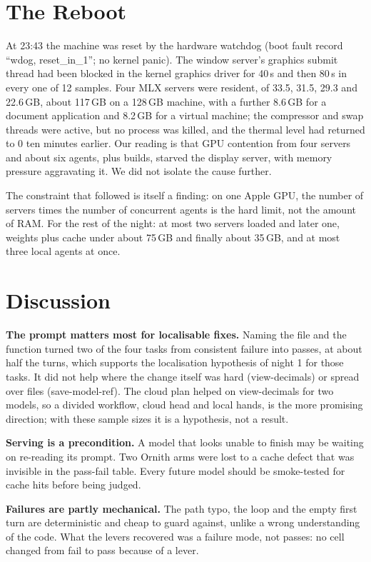 \section{The Reboot}\label{sec:reboot}

At 23:43 the machine was reset by the hardware watchdog (boot fault record ``wdog, reset\_in\_1''; no kernel panic).
The window server's graphics submit thread had been blocked in the kernel graphics driver for 40\,s and then 80\,s in
every one of 12 samples. Four MLX servers were resident, of 33.5, 31.5, 29.3 and 22.6\,GB, about 117\,GB on a 128\,GB
machine, with a further 8.6\,GB for a document application and 8.2\,GB for a virtual machine; the compressor and swap
threads were active, but no process was killed, and the thermal level had returned to 0 ten minutes earlier. Our
reading is that GPU contention from four servers and about six agents, plus builds, starved the display server, with
memory pressure aggravating it. We did not isolate the cause further.

The constraint that followed is itself a finding: on one Apple GPU, the number of servers times the number of
concurrent agents is the hard limit, not the amount of RAM. For the rest of the night: at most two servers loaded and
later one, weights plus cache under about 75\,GB and finally about 35\,GB, and at most three local agents at once.

\section{Discussion}\label{sec:discussion}

\textbf{The prompt matters most for localisable fixes.} Naming the file and the function turned two of the four
tasks from consistent failure into passes, at about half the turns, which supports the localisation
hypothesis of night 1 for those tasks. It did not help where the change itself was hard (view-decimals) or spread over
files (save-model-ref). The cloud plan helped on view-decimals for two models, so a divided workflow, cloud head and
local hands, is the more promising direction; with these sample sizes it is a hypothesis, not a result.

\textbf{Serving is a precondition.} A model that looks unable to finish may be waiting on re-reading its prompt. Two
Ornith arms were lost to a cache defect that was invisible in the pass-fail table. Every future model should be
smoke-tested for cache hits before being judged.

\textbf{Failures are partly mechanical.} The path typo, the loop and the empty first turn are deterministic and
cheap to guard against, unlike a wrong understanding of the code. What the levers recovered was a failure mode, not passes: no cell changed from fail to pass because of a lever.

